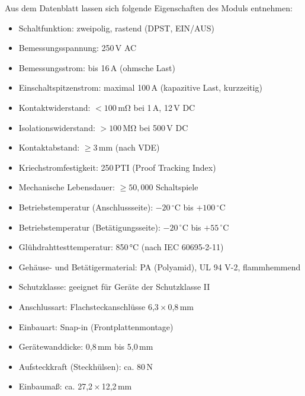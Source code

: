 Aus dem Datenblatt \cite{reichelt_wippschalter_1552_2021} lassen sich folgende Eigenschaften des Moduls entnehmen:

\begin{itemize}
	\item Schaltfunktion: zweipolig, rastend (DPST, EIN/AUS)
	\item Bemessungsspannung: 250\,V AC
	\item Bemessungsstrom: bis 16\,A (ohmsche Last)
	\item Einschaltspitzenstrom: maximal 100\,A (kapazitive Last, kurzzeitig)
	\item Kontaktwiderstand: $< 100\,\mathrm{m\Omega}$ bei 1\,A, 12\,V DC
	\item Isolationswiderstand: $> 100\,\mathrm{M\Omega}$ bei 500\,V DC
	\item Kontaktabstand: $\geq 3\,\mathrm{mm}$ (nach VDE)
	\item Kriechstromfestigkeit: 250\,PTI (Proof Tracking Index)
	\item Mechanische Lebensdauer: $\geq 50{,}000$ Schaltspiele
	\item Betriebstemperatur (Anschlussseite): $-20\,^{\circ}\mathrm{C}$ bis $+100\,^{\circ}\mathrm{C}$
	\item Betriebstemperatur (Betätigungsseite): $-20\,^{\circ}\mathrm{C}$ bis $+55\,^{\circ}\mathrm{C}$
	\item Glühdrahttesttemperatur: 850\,°C (nach IEC 60695-2-11)
	\item Gehäuse- und Betätigermaterial: PA (Polyamid), UL 94 V-2, flammhemmend
	\item Schutzklasse: geeignet für Geräte der Schutzklasse II
	\item Anschlussart: Flachsteckanschlüsse 6{,}3\,×\,0{,}8\,mm
	\item Einbauart: Snap-in (Frontplattenmontage)
	\item Gerätewanddicke: 0{,}8\,mm bis 5{,}0\,mm
	\item Aufsteckkraft (Steckhülsen): ca. 80\,N
	\item Einbaumaß: ca. 27{,}2\,×\,12{,}2\,mm
\end{itemize}